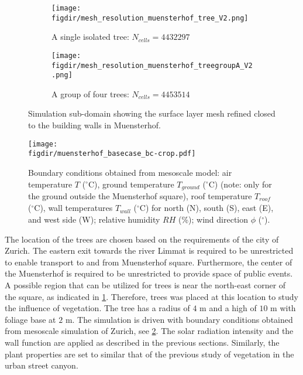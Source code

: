 \begin{figure}[p]
	\centering
	\begin{subfigure}[b]{0.8\linewidth}
		\texttt{[image: \\figdir/mesh\_resolution\_muensterhof\_tree\_V2.png]}
		\caption{A single isolated tree: $N_{\textit{cells}} = \num{4432297}$}%
	\end{subfigure}
	
	\medskip
	
	\begin{subfigure}[b]{0.8\linewidth}
		\texttt{[image: \\figdir/mesh\_resolution\_muensterhof\_treegroupA\_V2.png]}
		\caption{A group of four trees: $N_{\textit{cells}} = \num{4453514}$}%
	\end{subfigure}
	\caption{Simulation sub-domain showing the surface layer mesh refined closed to the building walls in Muensterhof.}
	\label{fig:mesh_resolution_muensterhof_tree}
\end{figure}

\begin{figure}[p]
	\centering
	\texttt{[image: \\figdir/muensterhof\_basecase\_bc-crop.pdf]}
	\caption{Boundary conditions obtained from mesoscale model:  air temperature $T$ ($^{\circ}$C), ground temperature $T_{\textit{ground}}$ ($^{\circ}$C) (note: only for the ground outside the Muensterhof square), roof temperature $T_{\textit{roof}}$ ($^{\circ}$C), wall temperatures $T_{\textit{wall}}$ ($^{\circ}$C) for north (N), south (S), east (E), and west side (W);  relative humidity $RH$ (\%);  wind direction $\phi$ ($^{\circ}$). }
	\label{fig:muensterhof_bc}
\end{figure}


The location of the trees are chosen based on the requirements of the city of Zurich. The eastern exit towards the river Limmat is required to be unrestricted to enable transport to and from Muensterhof square. Furthermore, the center of the Muensterhof is required to be unrestricted to provide space of public events. A possible region that can be utilized for trees is near the north-east corner of the square, as indicated in \cref{fig:mesh_resolution_muensterhof_tree}. Therefore, trees was placed at this location to study the influence of vegetation. The tree has a radius of $4$ m and a high of $10$ m with foliage base at $2$ m. The simulation is driven with boundary conditions obtained from mesoscale simulation of Zurich, see \cref{fig:muensterhof_bc}. The solar radiation intensity and the wall function are applied as described in the previous sections. Similarly, the plant properties are set to similar that of the previous study of vegetation in the urban street canyon. 

